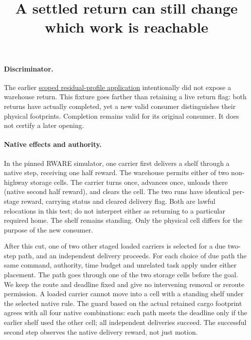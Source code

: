 \documentclass[11pt]{article}
\title{A settled return can still change which work is reachable}
\date{}
\begin{document}
\maketitle

\paragraph{Discriminator.}
The earlier
\href{https://github.com/eternal-november/eos-research-programmes/pull/580}
{scoped residual-profile application} intentionally did not expose a
warehouse return. This fixture goes farther than retaining a live return
flag: both returns have actually completed, yet a new valid consumer
distinguishes their physical footprints. Completion remains valid for its
original consumer. It does not certify a later opening.

\paragraph{Native effects and authority.}
In the pinned RWARE simulator, one carrier first delivers a shelf
through a native step, receiving one half reward. The warehouse permits
either of two non-highway storage cells. The carrier turns once, advances
once, unloads there (native second half reward), and clears the cell.
The two runs have identical per-stage reward, carrying status and
cleared delivery flag. Both are lawful relocations in this test; do
not interpret either as returning to a particular required home.
The shelf remains standing. Only the physical cell differs for the
purpose of the new consumer.

After this cut, one of two other staged loaded carriers is selected
for a due two-step path, and an independent delivery proceeds.
For each choice of due path the same command, authority, time budget
and unrelated task apply under either placement. The path goes
through one of the two storage cells before the goal. We keep the
route and deadline fixed and give no intervening removal or reroute
permission. A loaded carrier cannot move into a cell with a standing
shelf under the selected native rule. The guard based on the actual
retained cargo footprint agrees with all four native combinations:
each path meets the deadline only if the earlier shelf used the
other cell; all independent deliveries succeed. The successful
second step observes the native delivery reward, not just motion.
\end{document}
